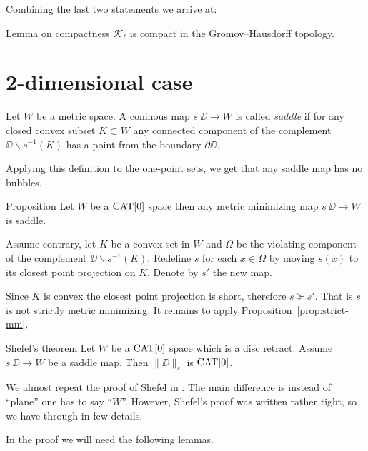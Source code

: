 \documentclass[a4paper,10pt]{amsart}
\begin{document}
Combining the last two statements we arrive at:

\begin{thm}{Lemma on compactness}\label{lem:compact}
$\mathcal{K}_\ell$ is compact in the Gromov--Hausdorff topology.
\end{thm}

\section{2-dimensional case}

Let $W$ be a metric space.
A coninous map $s\:\DD\to W$ is called \emph{saddle} if for any closed convex subset $K\subset W$ 
any connected component of the complement $\DD\backslash s^{-1}(K)$
has a point from the boundary $\partial \DD$.

Applying this definition to the one-point sets,
we get that any saddle map has no bubbles.


\begin{thm}{Proposition}
Let $W$ be a $\mathop{\rm CAT}\nolimits[0]$ space then any metric minimizing map $s\:\DD\to W$ is saddle.
\end{thm}

Assume contrary, let $K$ be a convex set in $W$
and $\Omega$ be the violating component of the complement $\DD\backslash s^{-1}(K)$.
Redefine $s$ for each $x\in\Omega$ by moving 
$s(x)$ to its closest point projection on $K$.
Denote by $s'$ the new map.

Since $K$ is convex the closest point projection is short,
therefore $s\succcurlyeq s'$.
That is $s$ is not strictly metric minimizing.
It remains to apply Proposition~\ref{prop:strict-mm}.
\qeds


\begin{thm}{Shefel's theorem}\label{thm:shefel-2D}
Let $W$ be a $\mathop{\rm CAT}\nolimits[0]$ space which is a disc retract.
Assume $s\:\DD\to W$ be a saddle map. 
Then $\|\DD\|_s$ is $\mathop{\rm CAT}\nolimits[0]$.
\end{thm}

We almost repeat the proof of Shefel in \cite{shefel-2D}.
The main difference is instead of ``plane'' one has to say ``$W$''.
However, Shefel's proof was written rather tight, so we have through in few details.

In the proof we will need the following lemmas.
\end{document}
